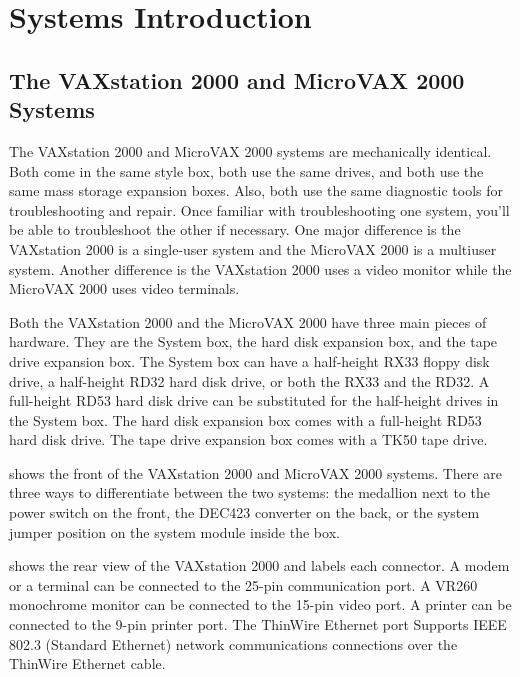 \chapter{Systems Introduction}
\section{The VAXstation 2000 and MicroVAX 2000 Systems}
\pagestyle{main}
\setcounter{page}{1}


The VAXstation 2000 and MicroVAX 2000 systems are mechanically
identical. Both come in the same style box, both use the same drives,
and both use the same mass storage expansion boxes. Also, both use
the same diagnostic tools for troubleshooting and repair. Once familiar
with troubleshooting one system, you'll be able to troubleshoot the other
if necessary. One major difference is the VAXstation 2000 is a single-user
system and the MicroVAX 2000 is a multiuser system. Another difference
is the VAXstation 2000 uses a video monitor while the MicroVAX 2000 uses
video terminals.

Both the VAXstation 2000 and the MicroVAX 2000 have three main pieces
of hardware. They are the System box, the hard disk expansion box, and
the tape drive expansion box. The System box can have a half-height RX33
floppy disk drive, a half-height RD32 hard disk drive, or both the RX33 and
the RD32. A full-height RD53 hard disk drive can be substituted for the 
half-height drives in the System box. The hard disk expansion box comes with a
full-height RD53 hard disk drive. The tape drive expansion box comes with
a TK50 tape drive.

\newpage

 shows the front of the VAXstation 2000 and MicroVAX 2000
systems. There are three ways to differentiate between the two systems:
the medallion next to the power switch on the front, the DEC423 converter
on the back, or the system jumper position on the system module inside
the box.


\newpage
{} shows the rear view of the VAXstation 2000 and labels each
connector. A modem or a terminal can be connected to the 25-pin 
communication port. A VR260 monochrome monitor can be connected to the
15-pin video port. A printer can be connected to the 9-pin printer port. The
ThinWire Ethernet port Supports IEEE 802.3 (Standard Ethernet) network
communications connections over the ThinWire Ethernet cable.

